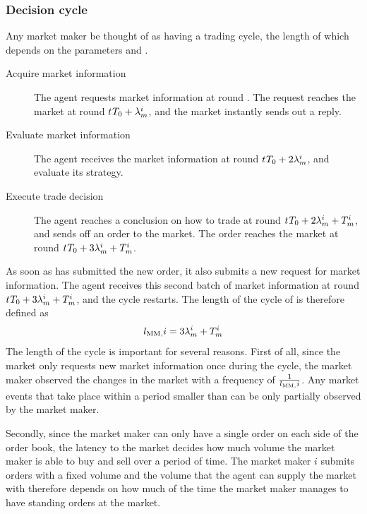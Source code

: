 \subsubsection{Decision cycle}\label{section_tradeCycles}
Any market maker  be thought of as having a trading cycle, the length of which depends on the parameters  and . 
\begin{description}
\item[Acquire market information] The agent requests market information at round . The request reaches the market at round $t_{}{T_0} + \lambda_m^{i}$, and the market instantly sends out a reply.
\item[Evaluate market information] The agent receives the market information at round $t_{}{T_0} +  2\lambda_m^{i}$, and evaluate its strategy. 
\item[Execute trade decision] The agent reaches a conclusion on how to trade at round $t_{}{T_0} + 2\lambda_m^{i} + T_m^{i}$, and sends off an order to the market. The order reaches the market at round $t_{}{T_0} + 3\lambda_m^{i} + T_m^{i}$.
\end{description}
As soon as  has submitted the new order, it also submits a new request for market information. The agent receives this second batch of market information at round $t_{}{T_0} + 3\lambda_m^{i} + T_m^{i}$, and the cycle restarts. The length of the cycle of  is therefore defined as
\begin{equation}
l_{\text{MM}, {}}{i} = 3\lambda_m^{i} + T_m^{i}
\end{equation}
The length of the cycle is important for several reasons. First of all, since the market only requests new market information once during the cycle, the market maker observed the changes in the market with a frequency of $\frac{1}{l_{\text{MM}, {}}{i}}$. Any market events that take place within a period smaller than  can be only partially observed by the market maker.

Secondly, since the market maker can only have a single order on each side of the order book, the latency to the market decides how much volume the market maker is able to buy and sell over a period of time. The market maker $i$ submits orders with a fixed volume  and the volume that the agent can supply the market with therefore depends on how much of the time the market maker manages to have standing orders at the market.

